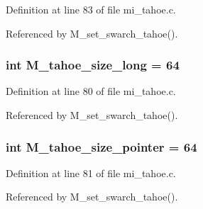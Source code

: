 Definition at line 83 of file mi\_\-tahoe.c.

Referenced by M\_\-set\_\-swarch\_\-tahoe().
\subsubsection{\setlength{\rightskip}{0pt plus 5cm}int \bf{M\_\-tahoe\_\-size\_\-long} = 64}\label{mi__tahoe_8c_54027c199505594190d4eb40419d1a4a}




Definition at line 80 of file mi\_\-tahoe.c.

Referenced by M\_\-set\_\-swarch\_\-tahoe().
\subsubsection{\setlength{\rightskip}{0pt plus 5cm}int \bf{M\_\-tahoe\_\-size\_\-pointer} = 64}\label{mi__tahoe_8c_453bb38f993c0b878ea083f779843bd0}




Definition at line 81 of file mi\_\-tahoe.c.

Referenced by M\_\-set\_\-swarch\_\-tahoe().